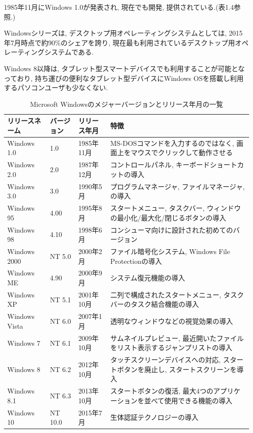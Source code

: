 1985年11月にWindows 1.0が発表され, 現在でも開発, 提供されている.(表1.4参照.)

Windowsシリーズは, デスクトップ用オペレーティングシステムとしては, 2015年7月時点で約90\%のシェアを誇り, 現在最も利用されているデスクトップ用オペレーティングシステムである.

Windows 8以降は, タブレット型スマートデバイスでも利用することが可能となっており, 持ち運びの便利なタブレット型デバイスにWindows OSを搭載し利用するパソコンユーザも少なくない.

\begin{table}[htb]
\begin{center}
\begin{tabular}{|l|l|l|p{6cm}|} \hline
リリースネーム & バージョン & リリース年月 & 特徴 \\ \hline \hline
Windows 1.0 & 1.0 & 1985年11月 & MS-DOSコマンドを入力するのではなく, 画面上をマウスでクリックして動作させる \\ \hline
Windows 2.0 & 2.0 & 1987年12月 & コントロールパネル, キーボードショートカットの導入 \\ \hline
Windows 3.0 & 3.0 & 1990年5月 & プログラムマネージャ, ファイルマネージャ,の導入 \\ \hline
Windows 95 & 4.00 & 1995年8月 & スタートメニュー, タスクバー, ウィンドウの最小化/最大化/閉じるボタンの導入 \\ \hline
Windows 98 & 4.10 & 1998年6月 & コンシューマ向けに設計された初めてのバージョン \\ \hline
Windows 2000 & NT 5.0 & 2000年2月 & ファイル暗号化システム, Windows File Protectionの導入 \\ \hline
Windows ME & 4.90 & 2000年9月 & システム復元機能の導入 \\ \hline
Windows XP & NT 5.1 & 2001年10月 & 二列で構成されたスタートメニュー, タスクバーのタスク結合機能の導入 \\ \hline
Windows Vista & NT 6.0 & 2007年1月 & 透明なウィンドウなどの視覚効果の導入 \\ \hline
Windows 7 & NT 6.1 & 2009年10月 & サムネイルプレビュー, 最近開いたファイルをリスト表示するジャンプリストの導入 \\ \hline
Windows 8 & NT 6.2 & 2012年10月 & タッチスクリーンデバイスへの対応, スタートボタンを廃止し, スタートスクリーンを導入 \\ \hline
Windows 8.1 & NT 6.3 & 2013年10月 & スタートボタンの復活, 最大4つのアプリケーションを並べて使用できる機能の導入 \\ \hline
Windows 10 & NT 10.0 & 2015年7月 & 生体認証テクノロジーの導入 \\ \hline
\end{tabular}
\caption{Microsoft Windowsのメジャーバージョンとリリース年月の一覧}
\end{center}
\end{table}

